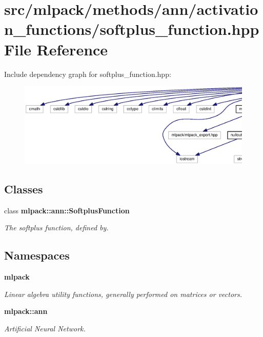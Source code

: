 \section{src/mlpack/methods/ann/activation\+\_\+functions/softplus\+\_\+function.hpp File Reference}
\label{softplus__function_8hpp}
Include dependency graph for softplus\+\_\+function.\+hpp\+:
\nopagebreak
\begin{figure}[H]
\begin{center}
\leavevmode
\includegraphics[width=350pt]{softplus__function_8hpp__incl}
\end{center}
\end{figure}
\subsection*{Classes}
\begin{DoxyCompactItemize}
\item 
class {\bf mlpack\+::ann\+::\+Softplus\+Function}
\begin{DoxyCompactList}\small\item\em The softplus function, defined by. \end{DoxyCompactList}\end{DoxyCompactItemize}
\subsection*{Namespaces}
\begin{DoxyCompactItemize}
\item 
 {\bf mlpack}
\begin{DoxyCompactList}\small\item\em Linear algebra utility functions, generally performed on matrices or vectors. \end{DoxyCompactList}\item 
 {\bf mlpack\+::ann}
\begin{DoxyCompactList}\small\item\em Artificial Neural Network. \end{DoxyCompactList}\end{DoxyCompactItemize}


